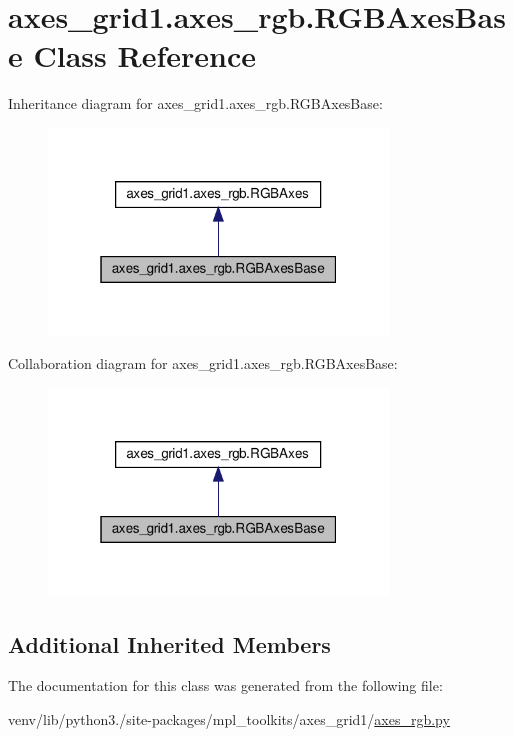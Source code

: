 \hypertarget{classaxes__grid1_1_1axes__rgb_1_1RGBAxesBase}{}\section{axes\+\_\+grid1.\+axes\+\_\+rgb.\+R\+G\+B\+Axes\+Base Class Reference}
\label{classaxes__grid1_1_1axes__rgb_1_1RGBAxesBase}


Inheritance diagram for axes\+\_\+grid1.\+axes\+\_\+rgb.\+R\+G\+B\+Axes\+Base\+:
\nopagebreak
\begin{figure}[H]
\begin{center}
\leavevmode
\includegraphics[width=256pt]{classaxes__grid1_1_1axes__rgb_1_1RGBAxesBase__inherit__graph}
\end{center}
\end{figure}


Collaboration diagram for axes\+\_\+grid1.\+axes\+\_\+rgb.\+R\+G\+B\+Axes\+Base\+:
\nopagebreak
\begin{figure}[H]
\begin{center}
\leavevmode
\includegraphics[width=256pt]{classaxes__grid1_1_1axes__rgb_1_1RGBAxesBase__coll__graph}
\end{center}
\end{figure}
\subsection*{Additional Inherited Members}


The documentation for this class was generated from the following file\+:\begin{DoxyCompactItemize}
\item 
venv/lib/python3./site-\/packages/mpl\+\_\+toolkits/axes\+\_\+grid1/\hyperlink{axes__grid1_2axes__rgb_8py}{axes\+\_\+rgb.\+py}\end{DoxyCompactItemize}
